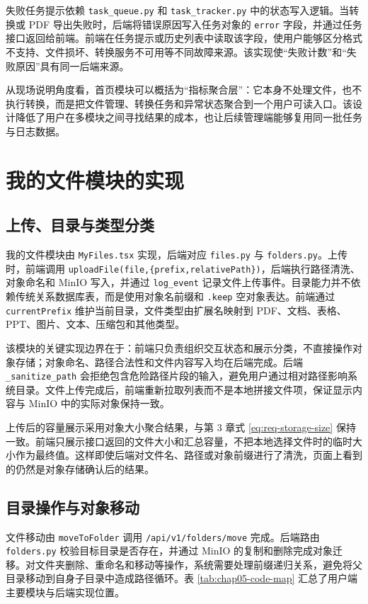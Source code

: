 失败任务提示依赖 \texttt{task\_queue.py} 和 \texttt{task\_tracker.py} 中的状态写入逻辑。当转换或 PDF 导出失败时，后端将错误原因写入任务对象的 \texttt{error} 字段，并通过任务接口返回给前端。前端在任务提示或历史列表中读取该字段，使用户能够区分格式不支持、文件损坏、转换服务不可用等不同故障来源。该实现使“失败计数”和“失败原因”具有同一后端来源。

从现场说明角度看，首页模块可以概括为“指标聚合层”：它本身不处理文件，也不执行转换，而是把文件管理、转换任务和异常状态聚合到一个用户可读入口。该设计降低了用户在多模块之间寻找结果的成本，也让后续管理端能够复用同一批任务与日志数据。

\section{我的文件模块的实现}

\subsection{上传、目录与类型分类}

我的文件模块由 \texttt{MyFiles.tsx} 实现，后端对应 \texttt{files.py} 与 \texttt{folders.py}。上传时，前端调用 \texttt{uploadFile(file,\{prefix,relativePath\})}，后端执行路径清洗、对象命名和 MinIO 写入，并通过 \texttt{log\_event} 记录文件上传事件。目录能力并不依赖传统关系数据库表，而是使用对象名前缀和 \texttt{.keep} 空对象表达。前端通过 \texttt{currentPrefix} 维护当前目录，文件类型由扩展名映射到 PDF、文档、表格、PPT、图片、文本、压缩包和其他类型。

该模块的关键实现边界在于：前端只负责组织交互状态和展示分类，不直接操作对象存储；对象命名、路径合法性和文件内容写入均在后端完成。后端 \texttt{\_sanitize\_path} 会拒绝包含危险路径片段的输入，避免用户通过相对路径影响系统目录。文件上传完成后，前端重新拉取列表而不是本地拼接文件项，保证显示内容与 MinIO 中的实际对象保持一致。

上传后的容量展示采用对象大小聚合结果，与第 3 章式 \ref{eq:req-storage-size} 保持一致。前端只展示接口返回的文件大小和汇总容量，不把本地选择文件时的临时大小作为最终值。这样即使后端对文件名、路径或对象前缀进行了清洗，页面上看到的仍然是对象存储确认后的结果。

\subsection{目录操作与对象移动}

文件移动由 \texttt{moveToFolder} 调用 \texttt{/api/v1/folders/move} 完成。后端路由 \texttt{folders.py} 校验目标目录是否存在，并通过 MinIO 的复制和删除完成对象迁移。对文件夹删除、重命名和移动等操作，系统需要处理前缀递归关系，避免将父目录移动到自身子目录中造成路径循环。表 \ref{tab:chap05-code-map} 汇总了用户端主要模块与后端实现位置。

